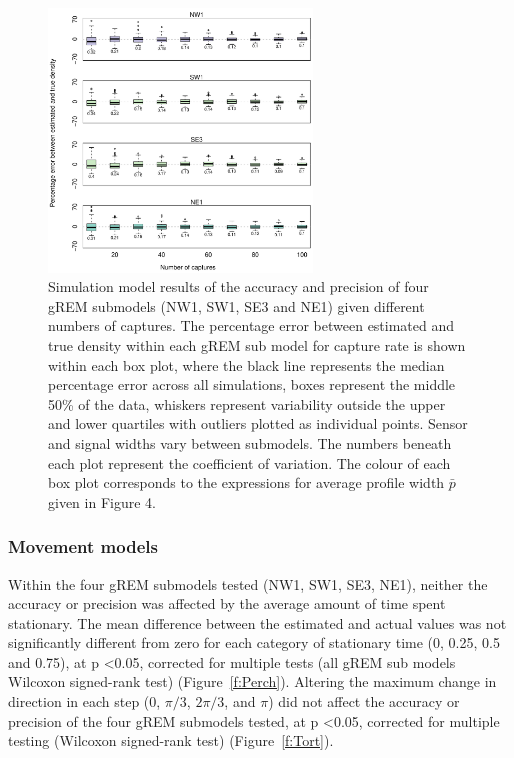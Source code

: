 \documentclass[a4paper,10pt,reqno,oneside]{amsart}
\begin{document}
\begin{figure}[t]
       \centering
	\includegraphics[width=7cm]{imgs/ResultsNoCaptures.pdf}
        \caption{Simulation model results of the accuracy and precision of four gREM submodels (NW1, SW1, SE3 and NE1) given different numbers of captures. The percentage error between estimated and true density within each gREM sub model for capture rate is shown within each box plot, where the black line represents the median percentage error across all simulations, boxes represent the middle 50\% of the data, whiskers represent variability outside the upper and lower quartiles with outliers plotted as individual points. Sensor and signal widths vary between submodels. The numbers beneath each plot represent the coefficient of variation. The colour of each box plot corresponds to the expressions for average profile width $\bar{p}$ given in Figure 4. }            
	\label{f:Captures}
\end{figure}


\subsubsection*{Movement models}

Within the four gREM submodels tested (NW1, SW1, SE3, NE1), neither the accuracy or precision was affected by the average amount of time spent stationary. The mean difference between the estimated and actual values was not significantly different from zero for each category of stationary time (0, 0.25, 0.5 and 0.75), at p \textless 0.05, corrected for multiple tests (all gREM sub models Wilcoxon signed-rank test) (Figure~\ref{f:Perch}). Altering the maximum change in direction in each step (0, $\pi/3$, $2\pi/3$, and $\pi$) did not affect the accuracy or precision of the four gREM submodels tested, at p \textless 0.05, corrected for multiple testing (Wilcoxon signed-rank test) (Figure~\ref{f:Tort}). 
\end{document}
